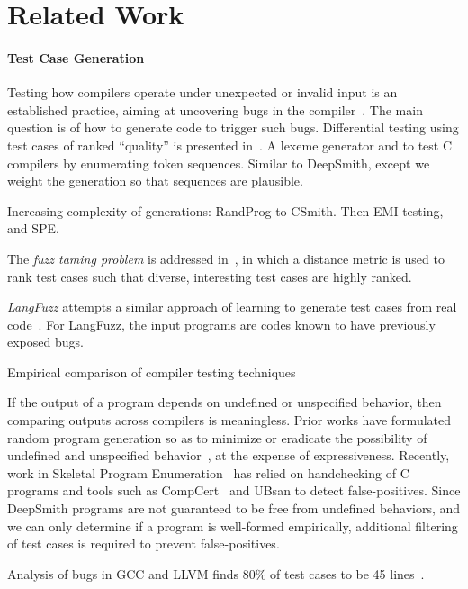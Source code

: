 \section{Related Work}\label{sec:rw}

\paragraph{Test Case Generation} 
Testing how compilers operate under unexpected or invalid input is an established practice, aiming at uncovering bugs in the compiler~\cite{Boujarwah1997}. The main question is of how to generate code to trigger such bugs. Differential testing using test cases of ranked ``quality'' is presented in~\cite{McKeeman1998}. A lexeme generator and to test C compilers by enumerating token sequences. Similar to DeepSmith, except we weight the generation so that sequences are plausible.

Increasing complexity of generations: RandProg to CSmith. Then EMI testing, and SPE.

The \emph{fuzz taming problem} is addressed in~\cite{Chen2013}, in which a distance metric is used to rank test cases such that diverse, interesting test cases are highly ranked.

\emph{LangFuzz} attempts a similar approach of learning to generate test cases from real code~\cite{Holler2012}. For LangFuzz, the input programs are codes known to have previously exposed bugs.

Empirical comparison of compiler testing techniques~\cite{Chen2014a}

 If the output of a program depends on undefined or unspecified behavior, then comparing outputs across compilers is meaningless. Prior works have formulated random program generation so as to minimize or eradicate the possibility of undefined and unspecified behavior~\cite{Yang2011c,Le2013a,Le2015}, at the expense of expressiveness. Recently, work in Skeletal Program Enumeration~\cite{Zhang2017a} has relied on handchecking of C programs and tools such as CompCert~\cite{Leroy2013} and UBsan to detect false-positives. Since DeepSmith programs are not guaranteed to be free from undefined behaviors, and we can only determine if a program is well-formed empirically, additional filtering of test cases is required to prevent false-positives.

Analysis of bugs in GCC and LLVM finds 80\% of test cases to be 45 lines~\cite{Sun2016}.

